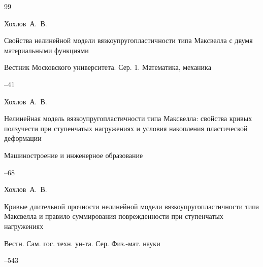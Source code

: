 \begin{thebibliography}{99}




\by Хохлов~А.~В.

\paper Свойства нелинейной модели вязкоупругопластичности типа Максвелла с двумя материальными функциями

\jour Вестник Московского университета. Сер. 1. Математика, механика



--41










\by Хохлов~А.~В.

\paper Нелинейная модель вязкоупругопластичности типа Максвелла: свойства кривых ползучести при ступенчатых нагружениях и условия накопления пластической деформации

\jour Машиностроение и инженерное образование



--68





\by Хохлов~А.~В.

\paper Кривые длительной прочности нелинейной модели вязкоупругопластичности типа Максвелла и правило суммирования поврежденности при ступенчатых нагружениях

\jour Вестн. Сам. гос. техн. ун-та. Сер. Физ.-мат. науки




--543


\end{thebibliography}
